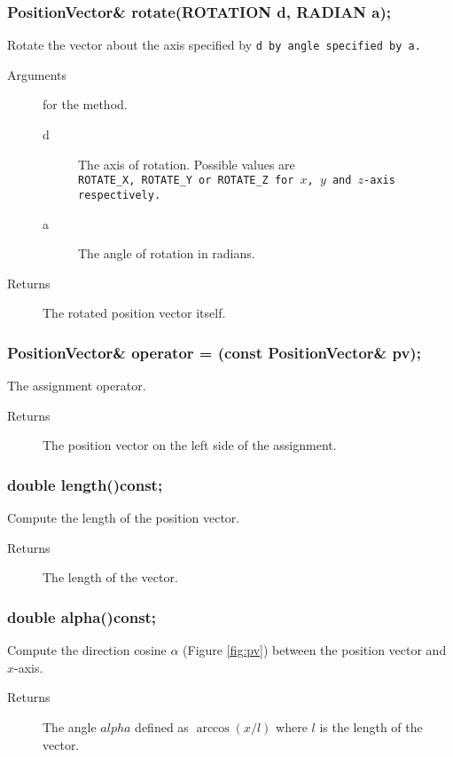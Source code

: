 \subsubsection{PositionVector\& rotate(ROTATION d, RADIAN a);} 
Rotate the vector about the  axis specified by \tt d \rm by angle
specified by \tt a\rm.
 \begin{description}  
    \item [Arguments] for the method.
      \begin{description}
        \item [d] The axis of rotation. Possible values are \\
                  \tt ROTATE\_X\rm, \tt ROTATE\_Y \rm
                  or \tt ROTATE\_Z \rm for $x$, $y$ and 
                  $z$-axis respectively. 
        \item [a] The angle of rotation in radians.
      \end{description}
    \item [Returns] The rotated position vector itself.
 \end{description}

\subsubsection{PositionVector\& operator = (const PositionVector\& pv);}
The assignment operator. 
    \begin{description}
       \item [Returns] The position vector on the left side of the assignment.
    \end{description}

\subsubsection{double length()const;}
 Compute the length of the position vector.
   \begin{description}
       \item [Returns] The length of the vector.
   \end{description} 

\subsubsection{double alpha()const;} 
Compute the direction cosine $\alpha$ (Figure \ref{fig:pv}) between the position 
vector and $x$-axis.
  \begin{description}
       \item [Returns] The angle $alpha$  defined as $\arccos (x / l)$
                       where $l$ is the length of the vector.
   
  \end{description} 

